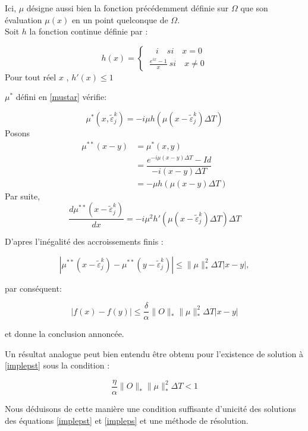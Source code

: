\begin{ proof }
	Ici, $\mu$ désigne aussi bien la fonction précédemment définie sur $\Omega$ que son évaluation $\mu(x)$ en un point quelconque de $\Omega$.
	$ $
	\\Soit $h$ la fonction continue définie par :
	
	\begin{equation}
	h(x) = \begin{cases}
	\quad i \quad si \quad x = 0\\
	\ \frac{e^{ix}-1}{x}\ si\quad x \neq 0
	\end{cases}
	\end{equation}
	Pour tout réel $x$ , $h'(x) \leq 1$
	
	$\mu^*$ défini en \eqref{mustar} vérifie:
	
	$$ \mu^*(x,\tilde{\varepsilon}_j^k) = -i\mu h (\mu(x-\tilde{\varepsilon}_j^k) \Delta T )$$
	Posons
	\begin{align*}
	\mu^{**}(x-y) &=\mu^*(x,y)\\
	&= \dfrac{e^{-i\mu (x-y) \Delta T}-Id}{-i(x-y)\Delta T}\\
	&=-\mu h(\mu (x-y)\Delta T)
	\end{align*}
	Par suite, 
	$$
	\frac{d\mu^{**} (x-\tilde{\varepsilon}_j^k)}{dx} = -i\mu^2 h'(\mu(x-\tilde{\varepsilon}_j^k)\Delta T) \Delta T 
	$$
	
	D'apres l'inégalité des accroissements finis :
	
	$$ |\mu^{**} (x-\tilde{\varepsilon}_j^k) - \mu^{**} (y-\tilde{\varepsilon}_j^k)| \leq \lVert \mu \rVert _*^2 \Delta T |x-y|,  $$
	
	par conséquent:
	
	$$ |f(x) - f(y)| \leq \frac{\delta}{\alpha} \lVert O\rVert_* \lVert \mu \rVert _*^2 \Delta T |x-y| $$
	
	et donne la conclusion annoncée.
\end{ proof }

Un résultat analogue peut bien entendu être obtenu pour l'existence de solution à \eqref{implepst} sous la condition :

\begin{equation} \label{cond2.27}
\frac{\eta}{\alpha} \lVert O\rVert_* \lVert \mu \rVert _*^2 \Delta T < 1
\end{equation}

Nous déduisons de cette manière une condition suffisante d'unicité des solutions des équations \eqref{implepst} et \eqref{impleps} et une méthode de résolution.


